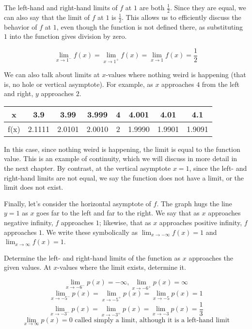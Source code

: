 The left-hand and right-hand limits of $ f $ at $ 1 $ are both $\frac{1}{2}$. Since 
they are equal, we can also say that the limit of $ f $ at $ 1 $ is $\frac{1}{2}$. 
This allows us to efficiently discuss the behavior of $ f $ at $ 1 $, even though 
the function is not defined there, as substituting $ 1 $ into the function gives 
division by zero.

$$ \lim_{x \rightarrow 1^-} f(x) = \lim_{x \rightarrow 1^+} f(x) = \lim_{x 
\rightarrow 1} f(x) = \frac{1}{2} $$

We can also talk about limits at $x$-values where nothing weird is happening (that 
is, no hole or vertical asymptote). For example, as $x$ approaches $4$ from the left 
and right, $y$ approaches $2$.

\begin{center}
\begin{tabular}{ |c|c|c|c|c|c|c|c| } 
 \hline
 x & 3.9 & 3.99 & 3.999 & 4 & 4.001 & 4.01 & 4.1 \\ 
 \hline
 f(x) & 2.1111 & 2.0101 & 2.0010 & 2 & 1.9990 & 1.9901 & 1.9091 \\ 
 \hline
\end{tabular}
\end{center}

In this case, since nothing weird is happening, the limit is equal to the function 
value. This is an example of continuity, which we will discuss in more detail in 
the next chapter. By contrast, at the vertical asymptote $ x = 1 $, since the left- 
and right-hand limits are not equal, we say the function does not have a limit, or 
the limit does not exist.

Finally, let's consider the horizontal asymptote of $f$. The graph hugs the line 
$y = 1$ as $x$ goes far to the left and far to the right. We say that as $x$ 
approaches negative infinity, $f$ approaches $1$; likewise, that as $x$ 
approaches positive infinity, $f$ approaches $1$. We write these symbolically as 
$\lim_{x \rightarrow -\infty} f(x) = 1$ and $\lim_{x \rightarrow \infty} f(x) = 1$. 

\begin{Exercise}[title=Limits Practice 1, label=limits1]
  Determine the left- and right-hand limits of the function as $x$ approaches the 
  given values. At $x$-values where the limit exists, determine it.
  \vspace{40mm}
\end{Exercise}
\begin{Answer}[ref=limits1] 
	$$ \lim_{x \rightarrow -6^-} p(x) = -\infty, \lim_{x \rightarrow -6^+} p(x) = \infty $$
	$$ \lim_{x \rightarrow -5^-} p(x) = \lim_{x \rightarrow -5^+} p(x) = \lim_{x \rightarrow -5} p(x) = 1 $$
	$$ \lim_{x \rightarrow -3^-} p(x) = \lim_{x \rightarrow -3^+} p(x) = \lim_{x \rightarrow -3} p(x) = \frac{1}{3} $$
	$$ \lim_{x \rightarrow \infty} p(x) = 0 \text{ called simply a limit, although it is a left-hand limit} $$
\end{Answer}

